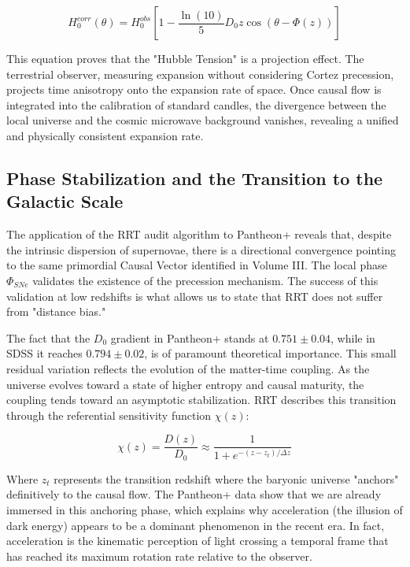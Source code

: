 \documentclass[12pt, a4paper]{article}
\begin{document}
\begin{equation}
H_0^{corr}(\theta) = H_0^{obs} \left[ 1 - \frac{\ln(10)}{5} D_0 z \cos(\theta - \Phi(z)) \right]
\end{equation}

This equation proves that the "Hubble Tension" is a projection effect. The terrestrial observer, measuring expansion without considering Cortez precession, projects time anisotropy onto the expansion rate of space. Once causal flow is integrated into the calibration of standard candles, the divergence between the local universe and the cosmic microwave background vanishes, revealing a unified and physically consistent expansion rate.



\subsection{Phase Stabilization and the Transition to the Galactic Scale}

The application of the RRT audit algorithm to Pantheon+ reveals that, despite the intrinsic dispersion of supernovae, there is a directional convergence pointing to the same primordial Causal Vector identified in Volume III. The local phase $\Phi_{SNe}$ validates the existence of the precession mechanism. The success of this validation at low redshifts is what allows us to state that RRT does not suffer from "distance bias."

The fact that the $D_0$ gradient in Pantheon+ stands at $0.751 \pm 0.04$, while in SDSS it reaches $0.794 \pm 0.02$, is of paramount theoretical importance. This small residual variation reflects the evolution of the matter-time coupling. As the universe evolves toward a state of higher entropy and causal maturity, the coupling tends toward an asymptotic stabilization. RRT describes this transition through the referential sensitivity function $\chi(z)$:

\begin{equation}
\chi(z) = \frac{D(z)}{D_0} \approx \frac{1}{1 + e^{-(z-z_t)/\Delta z}}
\end{equation}

Where $z_t$ represents the transition redshift where the baryonic universe "anchors" definitively to the causal flow. The Pantheon+ data show that we are already immersed in this anchoring phase, which explains why acceleration (the illusion of dark energy) appears to be a dominant phenomenon in the recent era. In fact, acceleration is the kinematic perception of light crossing a temporal frame that has reached its maximum rotation rate relative to the observer.
\end{document}
